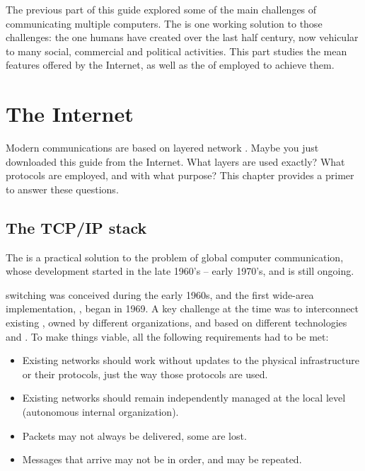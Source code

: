 The previous part of this guide explored some of the main challenges of communicating multiple computers.
The  is one working solution to those challenges: the one humans have created over the last half century,
now vehicular to many social, commercial and political activities. 
% 
This part studies the mean features offered by the Internet, as well as the  of  
employed to achieve them.


\chapter{The Internet}\label{sec:internet}

Modern communications are based on layered network . 
Maybe you just downloaded this guide from the Internet.
% 
What layers are used exactly? What protocols are employed, and with what purpose?
% 
This chapter provides a primer to answer these questions.

\section{The TCP/IP stack}


The  is a practical solution to the problem of global computer communication,
whose development started in the late 1960's -- early 1970's, and is still ongoing.

 switching was conceived during the early 1960s, and the first 
wide-area implementation, , began in 1969. 
% 
A key challenge at the time was to interconnect existing , 
owned by different organizations, and based on different technologies and .
% 
To make things viable, all the following requirements had to be met:
\begin{itemize}
    \item Existing networks should work without updates to the physical infrastructure 
      or their protocols, just the way those protocols are used.
    \item Existing networks should remain independently managed at the local level (autonomous internal organization).
    \item Packets may not always be delivered, some are lost.
    \item Messages that arrive may not be in order, and may be repeated.
\end{itemize}

